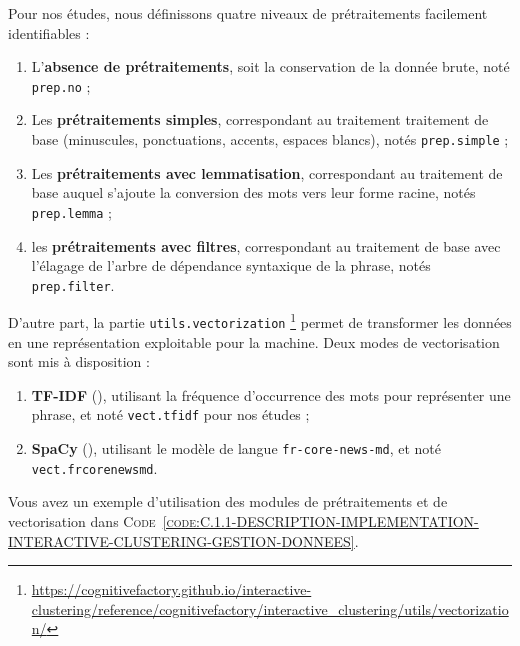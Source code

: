 	Pour nos études, nous définissons quatre niveaux de prétraitements facilement identifiables :
	\begin{enumerate}
		\item L'\textbf{absence de prétraitements}, soit la conservation de la donnée brute, noté \texttt{prep.no} ;
		\item Les \textbf{prétraitements simples}, correspondant au traitement traitement de base (minuscules, ponctuations, accents, espaces blancs), notés \texttt{prep.simple} ; 
		\item Les \textbf{prétraitements avec lemmatisation}, correspondant au traitement de base auquel s'ajoute la conversion des mots vers leur forme racine, notés \texttt{prep.lemma} ;
		\item les \textbf{prétraitements avec filtres}, correspondant au traitement de base avec l'élagage de l'arbre de dépendance syntaxique de la phrase, notés \texttt{prep.filter}.
	\end{enumerate}
	
	
	D'autre part, la partie \texttt{utils.vectorization} \footnote{
		\url{https://cognitivefactory.github.io/interactive-clustering/reference/cognitivefactory/interactive_clustering/utils/vectorization/}
	} permet de transformer les données en une représentation exploitable pour la machine.
	Deux modes de vectorisation sont mis à disposition :
	\begin{enumerate}
		\item \textbf{TF-IDF} (\cite{ramos:2003:using-tfidf-determine}), utilisant la fréquence d'occurrence des mots pour représenter une phrase, et noté \texttt{vect.tfidf} pour nos études ;
		\item \textbf{SpaCy} (\cite{honnibal-montani:2017:spacy-natural-language}), utilisant le modèle de langue \texttt{fr-core-news-md}, et noté \texttt{vect.frcorenewsmd}.
	\end{enumerate}
	
	Vous avez un exemple d'utilisation des modules de prétraitements et de vectorisation dans \textsc{Code~\ref{code:C.1.1-DESCRIPTION-IMPLEMENTATION-INTERACTIVE-CLUSTERING-GESTION-DONNEES}}.
	
